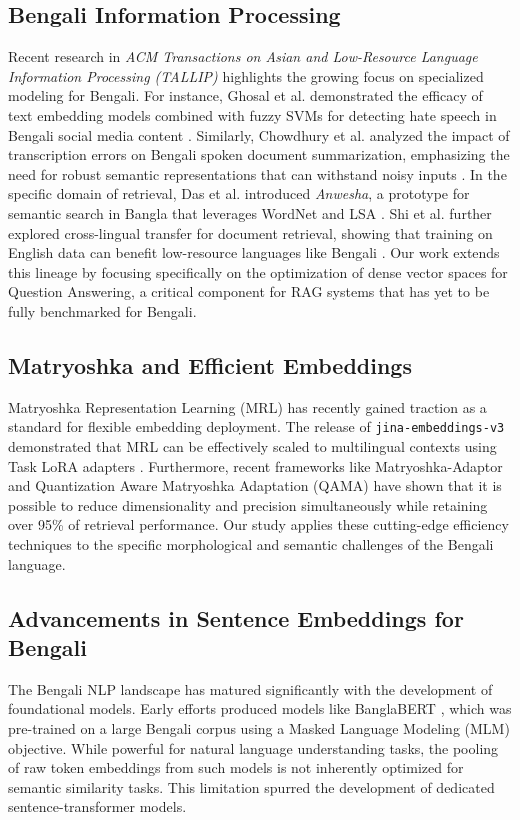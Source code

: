 \documentclass[acmsmall,screen,review]{acmart}
\begin{document}
\subsection{Bengali Information Processing}
Recent research in \textit{ACM Transactions on Asian and Low-Resource Language Information Processing (TALLIP)} highlights the growing focus on specialized modeling for Bengali. For instance, Ghosal et al. demonstrated the efficacy of text embedding models combined with fuzzy SVMs for detecting hate speech in Bengali social media content \cite{ghosal2023inculcating}. Similarly, Chowdhury et al. analyzed the impact of transcription errors on Bengali spoken document summarization, emphasizing the need for robust semantic representations that can withstand noisy inputs \cite{chowdhury2024analyzing}. In the specific domain of retrieval, Das et al. introduced \textit{Anwesha}, a prototype for semantic search in Bangla that leverages WordNet and LSA \cite{das2022anwesha}. Shi et al. further explored cross-lingual transfer for document retrieval, showing that training on English data can benefit low-resource languages like Bengali \cite{shi2021crosslingual}. Our work extends this lineage by focusing specifically on the optimization of dense vector spaces for Question Answering, a critical component for RAG systems that has yet to be fully benchmarked for Bengali.


\subsection{Matryoshka and Efficient Embeddings}
Matryoshka Representation Learning (MRL) has recently gained traction as a standard for flexible embedding deployment. The release of \texttt{jina-embeddings-v3} demonstrated that MRL can be effectively scaled to multilingual contexts using Task LoRA adapters \cite{sturua2024jina}. Furthermore, recent frameworks like Matryoshka-Adaptor \cite{yoon2024matryoshka} and Quantization Aware Matryoshka Adaptation (QAMA) \cite{ahemad2025quantization} have shown that it is possible to reduce dimensionality and precision simultaneously while retaining over 95\% of retrieval performance. Our study applies these cutting-edge efficiency techniques to the specific morphological and semantic challenges of the Bengali language.

\subsection{Advancements in Sentence Embeddings for Bengali}
The Bengali NLP landscape has matured significantly with the development of foundational models. Early efforts produced models like BanglaBERT \cite{bhattacharjee2020banglabert}, which was pre-trained on a large Bengali corpus using a Masked Language Modeling (MLM) objective. While powerful for natural language understanding tasks, the pooling of raw token embeddings from such models is not inherently optimized for semantic similarity tasks. This limitation spurred the development of dedicated sentence-transformer models.
\end{document}
